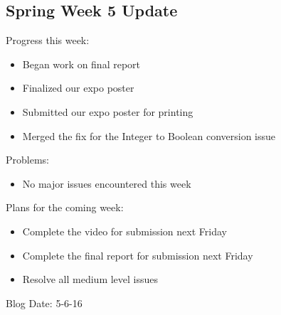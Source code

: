 \subsection{Spring Week 5 Update}
Progress this week:
\begin{itemize}
   \item Began work on final report
   \item Finalized our expo poster
   \item Submitted our expo poster for printing
   \item Merged the fix for the Integer to Boolean conversion issue
\end{itemize}
Problems:
\begin{itemize}
   \item No major issues encountered this week
\end{itemize}
Plans for the coming week:
\begin{itemize}
   \item Complete the video for submission next Friday
   \item Complete the final report for submission next Friday
   \item Resolve all medium level issues
\end{itemize}
Blog Date: 5-6-16

